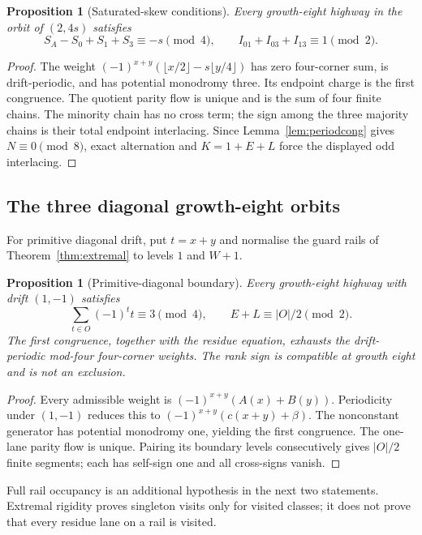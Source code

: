 \documentclass[11pt,letterpaper]{article}
\theoremstyle{plain}
\newtheorem{proposition}[theorem]{Proposition}
\theoremstyle{definition}
\begin{document}
\begin{NoHyper}
\begin{proposition}[Saturated-skew conditions]\label{prop:g8skew}
Every growth-eight highway in the orbit of $(2,4s)$ satisfies
\[
 S_A-S_0+S_1+S_3\equiv-s\pmod4,\qquad
 I_{01}+I_{03}+I_{13}\equiv1\pmod2.
\]
\end{proposition}

\begin{proof}
The weight
$(-1)^{x+y}(\lfloor x/2\rfloor-s\lfloor y/4\rfloor)$ has zero four-corner
sum, is drift-periodic, and has potential monodromy three.  Its endpoint charge
is the first congruence.  The quotient parity flow is unique and is the sum of
four finite chains.  The minority chain has no cross term; the sign among the
three majority chains is their total endpoint interlacing.  Since
Lemma~\ref{lem:periodcong} gives $N\equiv0\pmod8$, exact alternation and
$K=1+E+L$ force the displayed odd interlacing.
\end{proof}

\subsection{The three diagonal growth-eight orbits}

For primitive diagonal drift, put $t=x+y$ and normalise the guard rails of
Theorem~\ref{thm:extremal} to levels $1$ and $W+1$.

\begin{proposition}[Primitive-diagonal boundary]\label{prop:g8primitive}
Every growth-eight highway with drift $(1,-1)$ satisfies
\[
 \sum_{t\in O}(-1)^t t\equiv3\pmod4,\qquad
 E+L\equiv |O|/2\pmod2.
\]
The first congruence, together with the residue equation, exhausts the
drift-periodic mod-four four-corner weights.  The rank sign is compatible at
growth eight and is not an exclusion.
\end{proposition}

\begin{proof}
Every admissible weight is $(-1)^{x+y}(A(x)+B(y))$.
Periodicity under $(1,-1)$ reduces this to
$(-1)^{x+y}(c(x+y)+\beta)$.  The nonconstant generator has potential
monodromy one, yielding the first congruence.  The one-lane parity flow is
unique.  Pairing its boundary levels consecutively gives $|O|/2$ finite
segments; each has self-sign one and all cross-signs vanish.
\end{proof}

Full rail occupancy is an additional hypothesis in the next two statements.
Extremal rigidity proves singleton visits only for visited classes; it does not
prove that every residue lane on a rail is visited.


\end{NoHyper}
\end{document}
